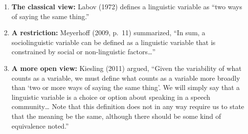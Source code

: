 \documentclass[
  11pt,
  letterpaper,
  DIV=11,
  numbers=noendperiod]{scrreprt}
\begin{document}
\begin{enumerate}
\def\labelenumi{\arabic{enumi}.}
\item
  \textbf{The classical view:} Labov (1972) defines a linguistic
  variable as ``two ways of saying the same thing.''
\item
  \textbf{A restriction:} Meyerhoff (2009, p.~11) summarized, ``In sum,
  a sociolinguistic variable can be defined as a linguistic variable
  that is constrained by social or non-linguistic factors\ldots{}''
\item
  \textbf{A more open view:} Kiesling (2011) argued, ``Given the
  variability of what counts as a variable, we must define what counts
  as a variable more broadly than `two or more ways of saying the same
  thing'. We will simply say that a linguistic variable is a choice or
  option about speaking in a speech community\ldots{} Note that this
  definition does not in any way require us to state that the meaning be
  the same, although there should be some kind of equivalence noted.''
\end{enumerate}
\end{document}
